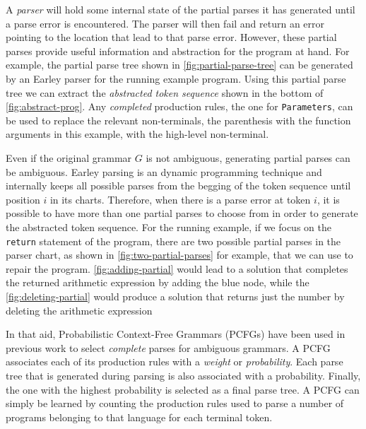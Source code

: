  A \emph{parser} will hold some
internal state of the partial parses it has generated until a parse error is
encountered. The parser will then fail and return an error pointing to the
location that lead to that parse error. However, these partial parses provide
useful information and abstraction for the program at hand. For example, the
partial parse tree shown in \autoref{fig:partial-parse-tree} can be generated by
an Earley parser for the running example program. Using this partial parse tree
we can extract the \emph{abstracted token sequence} shown in the bottom of
\autoref{fig:abstract-prog}. Any \emph{completed} production rules, \eg the
one for \texttt{Parameters}, can be used to replace the relevant non-terminals,
\eg the parenthesis with the function arguments in this example, with the
high-level non-terminal.





 Even if the original grammar $G$ is
not ambiguous, generating partial parses can be ambiguous. Earley parsing is an
dynamic programming technique and internally keeps all possible parses from the
begging of the token sequence until position $i$ in its charts. Therefore, when
there is a parse error at token $i$, it is possible to have more than one
partial parses to choose from in order to generate the abstracted token
sequence. For the running example, if we focus on the \texttt{return} statement
of the program, there are two possible partial parses in the parser chart, as
shown in \autoref{fig:two-partial-parses} for example, that we can use to repair the program. \autoref{fig:adding-partial} would lead to a solution that completes the returned arithmetic expression by adding the blue node, while the \autoref{fig:deleting-partial} would produce a solution that returns just the number by deleting the arithmetic expression

In that aid, Probabilistic Context-Free Grammars (PCFGs) have been used in
previous work \citep{Collins_2013, Jelinek_1992} to select \emph{complete}
parses for ambiguous grammars. A PCFG associates each of its production rules
with a \emph{weight} or \emph{probability}. Each parse tree that is generated
during parsing is also associated with a probability. Finally, the one with the
highest probability is selected as a final parse tree. A PCFG can simply be
learned \citep{Collins_2013} by counting the production rules used to parse a
number of programs belonging to that language for each terminal token.

